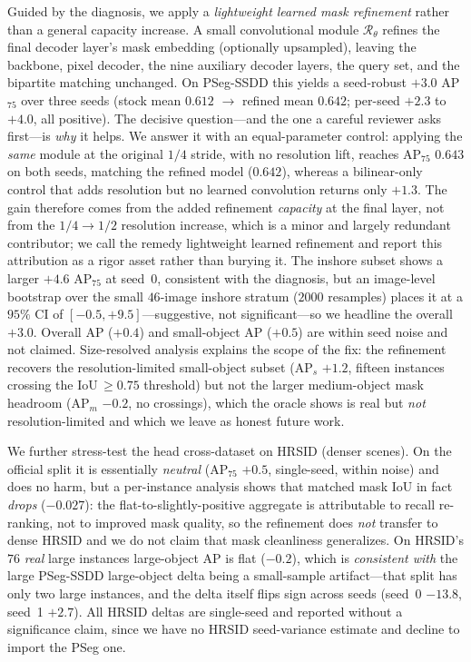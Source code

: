 \documentclass[journal]{IEEEtran}
\begin{document}
Guided by the diagnosis, we apply a \emph{lightweight learned mask refinement} rather than a general capacity increase. A small convolutional module $\mathcal{R}_{\theta}$ refines the final decoder layer's mask embedding (optionally upsampled), leaving the backbone, pixel decoder, the nine auxiliary decoder layers, the query set, and the bipartite matching unchanged. On PSeg-SSDD this yields a seed-robust $+3.0$ AP$_{75}$ over three seeds (stock mean $0.612$ $\rightarrow$ refined mean $0.642$; per-seed $+2.3$ to $+4.0$, all positive). The decisive question---and the one a careful reviewer asks first---is \emph{why} it helps. We answer it with an equal-parameter control: applying the \emph{same} module at the original $1/4$ stride, with no resolution lift, reaches AP$_{75}$ $0.643$ on both seeds, matching the refined model ($0.642$), whereas a bilinear-only control that adds resolution but no learned convolution returns only $+1.3$. The gain therefore comes from the added refinement \emph{capacity} at the final layer, not from the $1/4\!\rightarrow\!1/2$ resolution increase, which is a minor and largely redundant contributor; we call the remedy lightweight learned refinement and report this attribution as a rigor asset rather than burying it. The inshore subset shows a larger $+4.6$ AP$_{75}$ at seed~0, consistent with the diagnosis, but an image-level bootstrap over the small $46$-image inshore stratum ($2000$ resamples) places it at a $95\%$ CI of $[-0.5,+9.5]$---suggestive, not significant---so we headline the overall $+3.0$. Overall AP ($+0.4$) and small-object AP ($+0.5$) are within seed noise and not claimed. Size-resolved analysis explains the scope of the fix: the refinement recovers the resolution-limited small-object subset (AP$_s$ $+1.2$, fifteen instances crossing the IoU$\,\ge\!0.75$ threshold) but not the larger medium-object mask headroom (AP$_m$ $-0.2$, no crossings), which the oracle shows is real but \emph{not} resolution-limited and which we leave as honest future work.

We further stress-test the head cross-dataset on HRSID (denser scenes). On the official split it is essentially \emph{neutral} (AP$_{75}$ $+0.5$, single-seed, within noise) and does no harm, but a per-instance analysis shows that matched mask IoU in fact \emph{drops} ($-0.027$): the flat-to-slightly-positive aggregate is attributable to recall re-ranking, not to improved mask quality, so the refinement does \emph{not} transfer to dense HRSID and we do not claim that mask cleanliness generalizes. On HRSID's $76$ \emph{real} large instances large-object AP is flat ($-0.2$), which is \emph{consistent with} the large PSeg-SSDD large-object delta being a small-sample artifact---that split has only two large instances, and the delta itself flips sign across seeds (seed~0 $-13.8$, seed~1 $+2.7$). All HRSID deltas are single-seed and reported without a significance claim, since we have no HRSID seed-variance estimate and decline to import the PSeg one.
\end{document}
